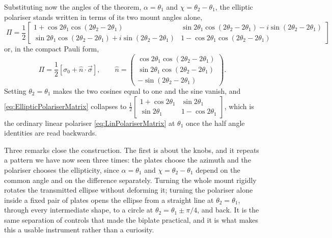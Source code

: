             Substituting now the angles of the theorem, $\alpha=\theta_1$ and $\chi=\theta_2-\theta_1$, the elliptic polariser stands written in terms of its two mount angles alone,
            \begin{equation}\label{eq:EllipticPolariserMatrix}
                \boxed{\;\Pi = \frac{1}{2}\begin{bmatrix}
                    1+\cos2\theta_1\cos\left(2\theta_2-2\theta_1\right) & \sin2\theta_1\cos\left(2\theta_2-2\theta_1\right)-i\sin\left(2\theta_2-2\theta_1\right) \\[4pt]
                    \sin2\theta_1\cos\left(2\theta_2-2\theta_1\right)+i\sin\left(2\theta_2-2\theta_1\right) & 1-\cos2\theta_1\cos\left(2\theta_2-2\theta_1\right)
                \end{bmatrix}\;}
            \end{equation}
            or, in the compact Pauli form,
            \begin{equation}\label{eq:EllipticPolariserPauli}
                \Pi = \frac{1}{2}\left[\sigma_0+\hat{n}\cdot\vec{\sigma}\right], \qquad \hat{n} = \begin{pmatrix}\cos2\theta_1\cos\left(2\theta_2-2\theta_1\right)\\ \sin2\theta_1\cos\left(2\theta_2-2\theta_1\right)\\ -\sin\left(2\theta_2-2\theta_1\right)\end{pmatrix} .
            \end{equation}
            Setting $\theta_2=\theta_1$ makes the two cosines equal to one and the sine vanish, and \ref{eq:EllipticPolariserMatrix} collapses to $\frac{1}{2}\left[\begin{smallmatrix}1+\cos2\theta_1 & \sin2\theta_1\\ \sin2\theta_1 & 1-\cos2\theta_1\end{smallmatrix}\right]$, which is the ordinary linear polariser \ref{eq:LinPolariserMatrix} at $\theta_1$ once the half angle identities are read backwards.

            Three remarks close the construction. The first is about the knobs, and it repeats a pattern we have now seen three times: the plates choose the azimuth and the polariser chooses the ellipticity, since $\alpha=\theta_1$ and $\chi=\theta_2-\theta_1$ depend on the common angle and on the difference separately. Turning the whole mount rigidly rotates the transmitted ellipse without deforming it; turning the polariser alone inside a fixed pair of plates opens the ellipse from a straight line at $\theta_2=\theta_1$, through every intermediate shape, to a circle at $\theta_2=\theta_1\pm\pi/4$, and back. It is the same separation of controls that made the biplate practical, and it is what makes this a usable instrument rather than a curiosity.


